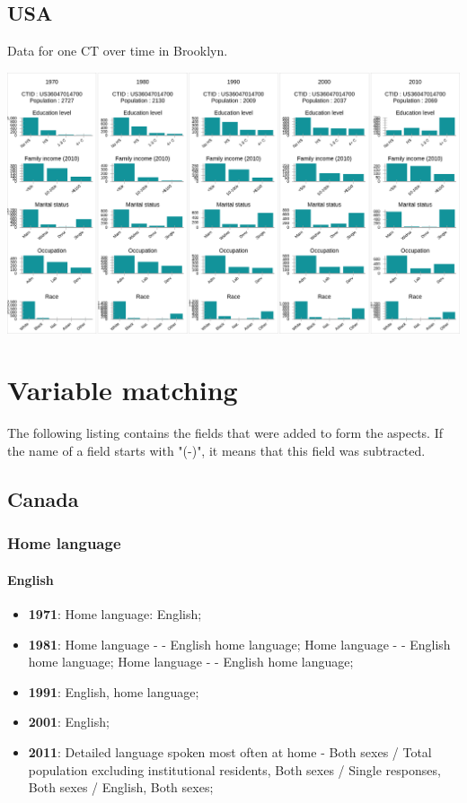 \documentclass[a4paper]{article}
\begin{document}
\clearpage

\subsection{USA}
Data for one CT over time in Brooklyn.
\begin{center}
  \includegraphics[width=\linewidth]{SampleUS.png}
  
\end{center} 


\clearpage
\section{Variable matching} 

The following listing contains the fields that were added to form the aspects.
If the name of a field starts with "(-)", it means that this field was
subtracted.


\subsection{Canada}
\subsubsection{Home language}
\paragraph{English}
\begin{itemize}
   \item{\textbf{1971}:  Home language: English;}
   \item{\textbf{1981}:  Home language - - English home language; Home language - - English home language; Home language - - English home language;}
   \item{\textbf{1991}:  English, home language;}
   \item{\textbf{2001}:  English;}
   \item{\textbf{2011}:  Detailed language spoken most often at home - Both sexes / Total population excluding institutional residents, Both sexes / Single responses, Both sexes / English, Both sexes;}
\end{itemize}
\end{document}
